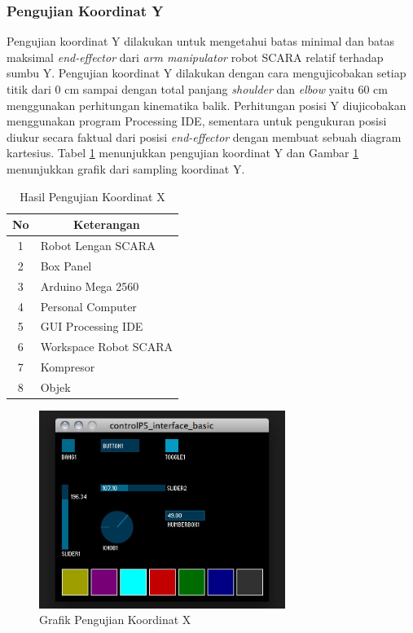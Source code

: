 \subsubsection{Pengujian Koordinat Y}
Pengujian koordinat Y dilakukan untuk mengetahui batas minimal dan batas maksimal \textit{end-effector} dari \textit{arm manipulator} robot SCARA relatif terhadap sumbu Y. Pengujian koordinat Y dilakukan dengan cara mengujicobakan setiap titik dari 0 cm sampai dengan total panjang \textit{shoulder} dan \textit{elbow} yaitu 60 cm menggunakan perhitungan kinematika balik. Perhitungan posisi Y diujicobakan menggunakan program Processing IDE, sementara untuk pengukuran posisi diukur secara faktual dari posisi \textit{end-effector} dengan membuat sebuah diagram kartesius. Tabel \ref{tbl.koordinaty} menunjukkan pengujian koordinat Y dan Gambar \ref{pic.koordinaty} menunjukkan grafik dari sampling koordinat Y.
 \begin{table}[H]
 	\centering
 	\caption{Hasil Pengujian Koordinat X}
 	\label{tbl.koordinaty}
 	\begin{tabular}{|c|l|}
 		\hline
 		\rowcolor[HTML]{9B9B9B} 
 		
 		No & \multicolumn{1}{c|}{\cellcolor[HTML]{9B9B9B}Keterangan} \\ \hline
 		1  & Robot Lengan SCARA                                      \\ \hline
 		2  & Box Panel                                               \\ \hline
 		3  & Arduino Mega 2560                                       \\ \hline
 		4  & Personal Computer                                       \\ \hline
 		5  & GUI Processing IDE                                      \\ \hline
 		6  & Workspace Robot SCARA                                   \\ \hline
 		7  & Kompresor                                               \\ \hline
 		8  & Objek                                                   \\ \hline
 	\end{tabular}
 	
 \end{table} 
 \begin{figure}[H]
 	\centering
 	\includegraphics[width=8cm]{gambar/controlp5.jpg}
 	\caption{Grafik Pengujian Koordinat X}
 	\label{pic.koordinaty}
 \end{figure}


